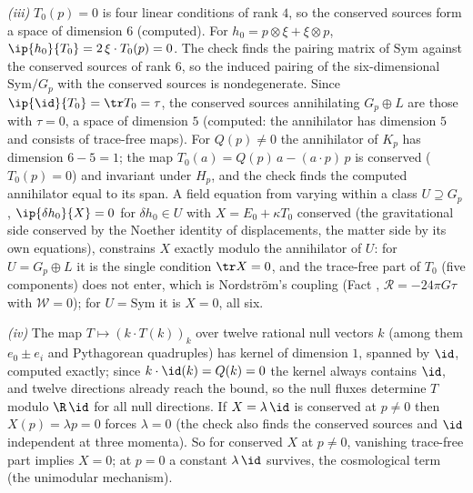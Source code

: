 \emph{(iii)} $T_{0}(p) = 0$ is four linear conditions of rank $4$, so the conserved sources form a space of dimension $6$ (computed). For $h_{0} = p \otimes \xi + \xi \otimes p$, $\ip{h_{0}}{T_{0}} = 2\,\xi \cdot T_{0}(p) = 0$. The check finds the pairing matrix of $\mathrm{Sym}$ against the conserved sources of rank $6$, so the induced pairing of the six-dimensional $\mathrm{Sym}/G_{p}$ with the conserved sources is nondegenerate. Since $\ip{\id}{T_{0}} = \tr T_{0} = \tau$, the conserved sources annihilating $G_{p} \oplus L$ are those with $\tau = 0$, a space of dimension $5$ (computed: the annihilator has dimension $5$ and consists of trace-free maps). For $Q(p) \neq 0$ the annihilator of $K_{p}$ has dimension $6 - 5 = 1$; the map $T_{0}(a) = Q(p)\,a - (a \cdot p)\,p$ is conserved ($T_{0}(p) = 0$) and invariant under $H_{p}$, and the check finds the computed annihilator equal to its span. A field equation from varying within a class $U \supseteq G_{p}$, $\ip{\delta h_{0}}{X} = 0$ for $\delta h_{0} \in U$ with $X = E_{0} + \kappa T_{0}$ conserved (the gravitational side conserved by the Noether identity of displacements, the matter side by its own equations), constrains $X$ exactly modulo the annihilator of $U$: for $U = G_{p} \oplus L$ it is the single condition $\tr X = 0$, and the trace-free part of $T_{0}$ (five components) does not enter, which is Nordstr\"om's coupling (Fact , $\mathcal{R} = -24\pi G\tau$ with $\mathcal{W} = 0$); for $U = \mathrm{Sym}$ it is $X = 0$, all six.

\emph{(iv)} The map $T \mapsto (k \cdot T(k))_{k}$ over twelve rational null vectors $k$ (among them $e_{0} \pm e_{i}$ and Pythagorean quadruples) has kernel of dimension $1$, spanned by $\id$, computed exactly; since $k \cdot \id(k) = Q(k) = 0$ the kernel always contains $\id$, and twelve directions already reach the bound, so the null fluxes determine $T$ modulo $\R\,\id$ for all null directions. If $X = \lambda\,\id$ is conserved at $p \neq 0$ then $X(p) = \lambda p = 0$ forces $\lambda = 0$ (the check also finds the conserved sources and $\id$ independent at three momenta). So for conserved $X$ at $p \neq 0$, vanishing trace-free part implies $X = 0$; at $p = 0$ a constant $\lambda\,\id$ survives, the cosmological term (the unimodular mechanism).


